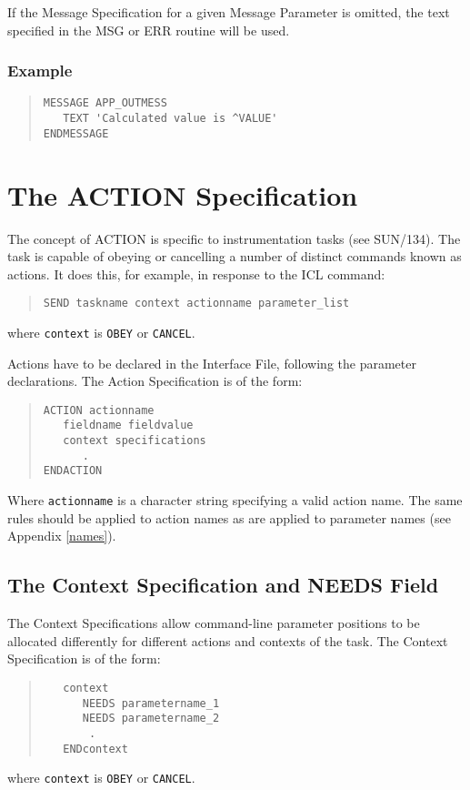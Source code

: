 \documentclass[twoside,11pt]{article}
\newcommand{\xref}[3]{#1}
\newcommand{\xlabel}[1]{}
\renewcommand{\_}{\texttt{\symbol{95}}}
\begin{document}
If the Message Specification for a given Message Parameter is omitted, the
text specified in the MSG or ERR routine will be used.

\subsubsection*{Example}
\begin{quote} \begin{verbatim}
MESSAGE APP_OUTMESS
   TEXT 'Calculated value is ^VALUE'
ENDMESSAGE
\end{verbatim} \end{quote}

\section{The ACTION Specification\xlabel{the_action_specification}
\label{action}}

The concept of ACTION is specific to instrumentation tasks (see
\xref{SUN/134}{sun134}{}).
The task is capable of obeying or cancelling a number of distinct commands
known as actions.
It does this, for example, in response to the ICL command:
\begin{quote} \begin{verbatim}
SEND taskname context actionname parameter_list
\end{verbatim} \end{quote}
where \texttt{context} is \texttt{OBEY} or \texttt{CANCEL}.

Actions have to be declared in the Interface File, following the parameter
declarations. The Action Specification is of the form:
\begin{quote} \begin{verbatim}
ACTION actionname
   fieldname fieldvalue
   context specifications
      .
ENDACTION
\end{verbatim} \end{quote}
Where \texttt{actionname} is a character string specifying a valid action name.
The same rules should be applied to action names as are applied to parameter
names (see Appendix \ref{names}).

\subsection{The Context Specification and NEEDS Field
\xlabel{the_context_specification_and_needs_field}\label{needs}}

The Context Specifications allow command-line parameter positions to be
allocated differently for different actions and contexts of the task.
The Context Specification is of the form:
\begin{quote} \begin{verbatim}
   context
      NEEDS parametername_1
      NEEDS parametername_2
       .
   ENDcontext
\end{verbatim} \end{quote}
where \texttt{context} is \texttt{OBEY} or \texttt{CANCEL}.
\end{document}
